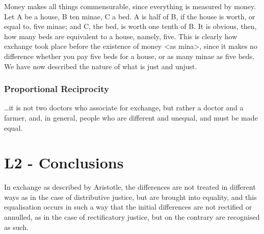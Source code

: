                     Money makes all things commensurable, since everything is measured by money. Let A be a house, B ten minae, C a bed. A is half of B, if the house is worth, or equal to, five minae; and C, the bed, is worth one tenth of B. It is obvious, then, how many beds are equivalent to a house, namely, five. This is clearly how exchange took place before the existence of money <as mina>, since it makes no difference whether you pay five beds for a house, or as many minae as five beds. We have now described the nature of what is just and unjust.

                \subsubsection{Proportional Reciprocity}

                    …it is not two doctors who associate for exchange, but rather a doctor and a farmer, and, in general, people who are different and unequal, and must be made equal.

        \section*{L2 - Conclusions}

            In exchange as described by Aristotle, the differences are not treated in different ways as in the case of distributive justice, but are brought into equality, and this equalisation occurs in such a way that the initial differences are not rectified or annulled, as in the case of rectificatory justice, but on the contrary are recognised as such.
            
